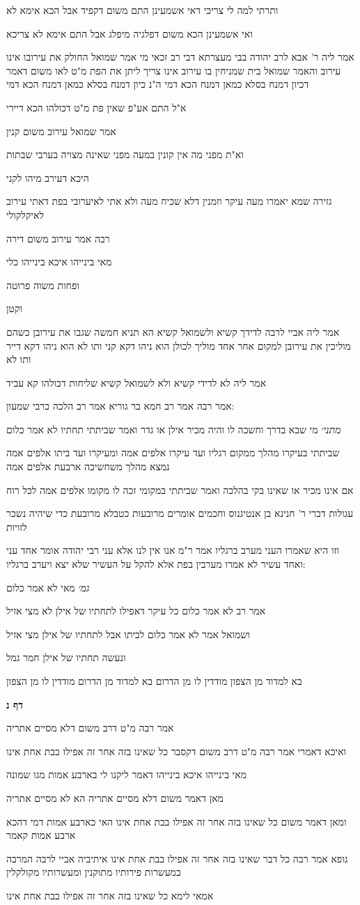 \documentclass[12pt, openany]{book}
\newcommand{\sethebfont}{
\fontsize{10.5pt}{21.0pt} \selectfont
}
\newcommand{\textblock}[1]{
{\sethebfont #1\\}	
}
\newcommand{\sectname}{}
\newcommand{\newsection}[1]{
	\addcontentsline{toc}{section}{#1}
	\renewcommand{\sectname}{#1}	
	\vspace{-\baselineskip}
	\begin{center}
		\textbf{%
\fontsize{16pt}{16pt}\selectfont
			#1}
	\end{center}
	\vspace{-\baselineskip}
	\nopagebreak
}
\begin{document}
\textblock{ותרתי למה לי צריכי דאי אשמעינן התם משום דקפיד אבל הכא אימא לא}
\textblock{ואי אשמעינן הכא משום דפלגיה מיפלג אבל התם אימא לא צריכא}
\textblock{אמר ליה ר' אבא לרב יהודה בבי מעצרתא דבי רב זכאי מי אמר שמואל החולק את עירובו אינו עירוב והאמר שמואל בית שמניחין בו עירוב אינו צריך ליתן את הפת מ"ט לאו משום דאמר דכיון דמנח בסלא כמאן דמנח הכא דמי ה"נ כיון דמנח בסלא כמאן דמנח הכא דמי}
\textblock{א"ל התם אע"פ שאין פת מ"ט דכולהו הכא דיירי}
\textblock{אמר שמואל עירוב משום קנין}
\textblock{וא"ת מפני מה אין קונין במעה מפני שאינה מצויה בערבי שבתות}
\textblock{היכא דעירב מיהו לקני}
\textblock{גזירה שמא יאמרו מעה עיקר וזמנין דלא שכיח מעה ולא אתי לאיערובי בפת דאתי עירוב לאיקלקולי}
\textblock{רבה אמר עירוב משום דירה}
\textblock{מאי בינייהו איכא בינייהו כלי}
\textblock{ופחות משוה פרוטה}
\textblock{וקטן}
\textblock{אמר ליה אביי לרבה לדידך קשיא ולשמואל קשיא הא תניא חמשה שגבו את עירובן כשהם מוליכין את עירובן למקום אחר אחד מוליך לכולן הוא ניהו דקא קני ותו לא הוא ניהו דקא דייר ותו לא}
\textblock{אמר ליה לא לדידי קשיא ולא לשמואל קשיא שליחות דכולהו קא עביד}
\textblock{אמר רבה אמר רב חמא בר גוריא אמר רב הלכה כרבי שמעון:}
\textblock{{\large\emph{מתני׳}} מי שבא בדרך וחשכה לו והיה מכיר אילן או גדר ואמר שביתתי תחתיו לא אמר כלום}
\textblock{שביתתי בעיקרו מהלך ממקום רגליו ועד עיקרו אלפים אמה ומעיקרו ועד ביתו אלפים אמה נמצא מהלך משחשיכה ארבעת אלפים אמה}
\textblock{אם אינו מכיר או שאינו בקי בהלכה ואמר שביתתי במקומי זכה לו מקומו אלפים אמה לכל רוח}
\textblock{עגולות דברי ר' חנינא בן אנטיגנוס וחכמים אומרים מרובעות כטבלא מרובעת כדי שיהיה נשכר לזויות}
\textblock{וזו היא שאמרו העני מערב ברגליו אמר ר"מ אנו אין לנו אלא עני רבי יהודה אומר אחד עני ואחד עשיר לא אמרו מערבין בפת אלא להקל על העשיר שלא יצא ויערב ברגליו:}
\textblock{{\large\emph{גמ׳}} מאי לא אמר כלום}
\textblock{אמר רב לא אמר כלום כל עיקר דאפילו לתחתיו של אילן לא מצי אזיל}
\textblock{ושמואל אמר לא אמר כלום לביתו אבל לתחתיו של אילן מצי אזיל}
\textblock{ונעשה תחתיו של אילן חמר גמל}
\textblock{בא למדוד מן הצפון מודדין לו מן הדרום בא למדוד מן הדרום מודדין לו מן הצפון}
\newsection{דף נ}
\textblock{אמר רבה מ"ט דרב משום דלא מסיים אתריה}
\textblock{ואיכא דאמרי אמר רבה מ"ט דרב משום דקסבר כל שאינו בזה אחר זה אפילו בבת אחת אינו}
\textblock{מאי בינייהו איכא בינייהו דאמר ליקנו לי בארבע אמות מגו שמונה}
\textblock{מאן דאמר משום דלא מסיים אתריה הא לא מסיים אתריה}
\textblock{ומאן דאמר משום כל שאינו בזה אחר זה אפילו בבת אחת אינו האי כארבע אמות דמי דהכא ארבע אמות קאמר}
\textblock{גופא אמר רבה כל דבר שאינו בזה אחר זה אפילו בבת אחת אינו איתיביה אביי לרבה המרבה במעשרות פירותיו מתוקנין ומעשרותיו מקולקלין}
\textblock{אמאי לימא כל שאינו בזה אחר זה אפילו בבת אחת אינו}
\end{document}
